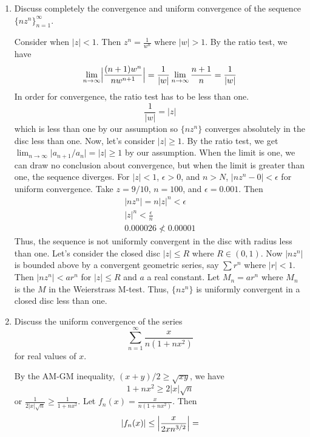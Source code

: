 \begin{enumerate}
\item
  Discuss completely the convergence and uniform convergence of the sequence
  \(\{nz^n\}_{n = 1}^{\infty}\).
  \par\smallskip
  Consider when \(\lvert z\rvert < 1\).
  Then \(z^n = \frac{1}{w^n}\) where \(\lvert w\rvert > 1\).
  By the ratio test, we have
  \[
  \lim_{n\to\infty}\Bigl\lvert\frac{(n + 1)w^n}{nw^{n + 1}}\Bigr\rvert =
  \frac{1}{\lvert w\rvert}\lim_{n\to\infty}\frac{n + 1}{n} =
  \frac{1}{\lvert w\rvert}
  \]
  In order for convergence, the ratio test has to be less than one.
  \[
  \frac{1}{\lvert w\rvert} = \lvert z\rvert
  \]
  which is less than one by our assumption so \(\{nz^n\}\) converges
  absolutely in the disc less than one.
  Now, let's consider \(\lvert z\rvert\geq 1\).
  By the ratio test, we get
  \(\lim_{n\to\infty}\lvert a_{n + 1}/a_n\rvert = \lvert z\rvert\geq 1\) by our
  assumption.
  When the limit is one, we can draw no conclusion about convergence, but when
  the limit is greater than one, the sequence diverges.
  For \(\lvert z\rvert < 1\), \(\epsilon > 0\), and \(n > N\),
  \(\lvert nz^n - 0\rvert < \epsilon\) for uniform convergence.
  Take \(z = 9/10\), \(n = 100\), and \(\epsilon = 0.001\).
  Then
  \begin{gather*}
    \lvert nz^n\rvert = n\lvert z\rvert^n < \epsilon\\
    \lvert z\rvert^n < \frac{\epsilon}{n}\\
    0.000026 \not < 0.00001
  \end{gather*}
  Thus, the sequence is not uniformly convergent in the disc with radius less
  than one.
  Let's consider the closed disc \(\lvert z\rvert\leq R\) where \(R\in(0,1)\).
  Now \(\lvert nz^n\rvert\) is bounded above by a convergent geometric series,
  say \(\sum r^n\) where \(\lvert r\rvert < 1\).
  Then \(\lvert nz^n\rvert < ar^n\) for \(\lvert z\rvert\leq R\) and \(a\) a
  real constant.
  Let \(M_n = ar^n\) where \(M_n\) is the \(M\) in the Weierstrass M-test.
  Thus, \(\{nz^n\}\) is uniformly convergent in a closed disc less than one.
\item
  Discuss the uniform convergence of the series
  \[
  \sum_{n = 1}^{\infty}\frac{x}{n(1 + nx^2)}
  \]
  for real values of \(x\).
  \par\smallskip
  By the AM-GM inequality, \((x + y)/2\geq \sqrt{xy}\), we have
  \[
  1 + nx^2\geq 2\lvert x\rvert\sqrt{n}
  \]
  or \(\frac{1}{2\lvert x\rvert\sqrt{n}}\geq\frac{1}{1 + nx^2}\).
  Let \(f_n(x) = \frac{x}{n(1 + nx^2)}\).
  Then
  \[
  \lvert f_n(x)\rvert\leq \Bigl\lvert\frac{x}{2xn^{3/2}}\Bigr\rvert =
\]
\end{enumerate}
